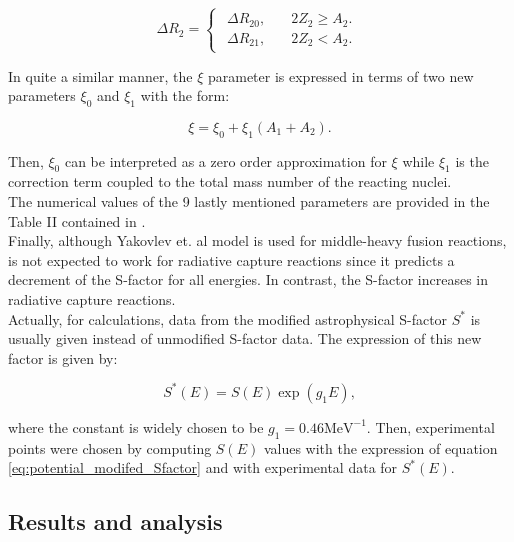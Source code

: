 \documentclass[openany]{book}
\begin{document}
\begin{equation} \label{eq:potential_Yakovlev_R2}
	\Delta R_2= 	\left\{\begin{array}{l}
		\begin{split}
			\Delta R_{20}, \quad & 2Z_2 \ge A_2.\\ 
			\Delta R_{21}, \quad & 2Z_2 < A_2.
		\end{split}
	\end{array}\right.
\end{equation}

In quite a similar manner, the $\xi$ parameter is expressed in terms of two new parameters $\xi_0$ and $\xi_1$ with the form:

\begin{equation} \label{eq:potential_Yakovlev_xi}
	\xi = 	\xi_0 + \xi_1(A_1 + A_2).
\end{equation}

Then, $\xi_0$ can be interpreted as a zero order approximation for $\xi$ while $\xi_1$ is the correction term coupled to the total mass number of the reacting nuclei. \\

The numerical values of the 9 lastly mentioned parameters are provided in the Table II contained in \cite{yakovlev_beard_gasques_wiescher_2010}. \\

Finally, although Yakovlev et. al model is used for middle-heavy fusion reactions, is not expected to work for radiative capture reactions since it predicts a decrement of the S-factor for all energies. In contrast, the S-factor increases in radiative capture reactions.  \\

Actually, for calculations, data from the modified astrophysical S-factor $S^{*}$ is usually given instead of unmodified S-factor data. The expression of this new factor is given by:

\begin{equation}\label{eq:potential_modifed_Sfactor}
	S^{*}(E) = S(E) \exp {(g_1E)},
\end{equation}

where the constant is widely chosen to be $g_1 = 0.46 \mathrm{MeV^{-1}}$. Then, experimental points were chosen by computing $S(E)$ values with the expression of equation \ref{eq:potential_modifed_Sfactor} and with experimental data for $S^{*}(E)$.


\subsection{Results and analysis} \label{sub:resultsAnalysisNonResonant}
\end{document}
